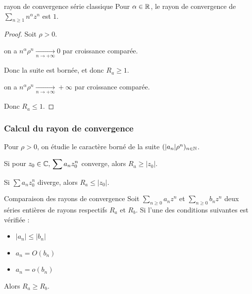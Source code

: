 \begin{propositionnt}{rayon de convergence série classique}{}
    Pour $\alpha \in \mathbb{R}$, le rayon de convergence de $\sum_{n \geqslant 1} n^\alpha z^n$ est $1$.
\end{propositionnt}


\begin{proof}
    Soit $\rho > 0$. 

     on a $n^\alpha \rho^n \xrightarrow[n \to + \infty ]{} 0$ par croissance comparée. 

    \avspace Donc la suite est bornée, et donc $R_a \geqslant 1$.

     on a $n^\alpha \rho^n \xrightarrow[n \to + \infty ]{} +\infty$ par croissance comparée.

    \avspace Donc $R_a \leqslant 1$.
\end{proof}

\subsubsection{Calcul du rayon de convergence}


\avspace Pour $\rho > 0$, on étudie le caractère borné de la suite $(|a_n| \rho^n)_{n \in \mathbb{N}}$.


\avspace Si pour $z_0 \in \mathbb{C}, \, \displaystyle \sum a_n z_0^n$ converge, alors $R_a \geqslant |z_0|$.

Si $\sum a_n z_0^n$ diverge, alors $R_a \leqslant |z_0|$.


\begin{proposition}{Comparaison des rayons de convergence}{}
    Soit $\sum_{n \geqslant 0} a_n z^n$ et $\sum_{n \geqslant 0} b_n z^n$ deux séries entières
    de rayons respectifs $R_a$ et $R_b$. Si l'une des conditions suivantes est vérifiée :
    \begin{itemize}
        \item $|a_n| \leqslant |b_n|$
        \item $a_n = O(b_n)$
        \item $a_n = o(b_n)$
    \end{itemize}
    Alors $R_a \geqslant R_b$.
\end{proposition}

